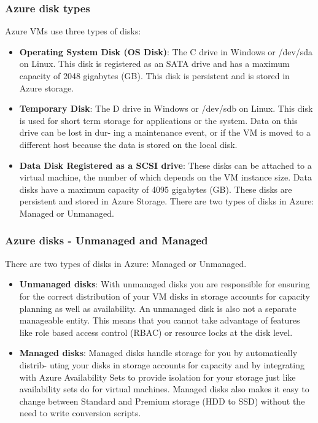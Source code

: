 \documentclass[12pt]{article}
\begin{document}
\subsubsection{Azure disk types}
Azure VMs use three types of disks:
\begin{itemize}
    
    \item \textbf{Operating System Disk (OS Disk)}: The C drive in Windows or /dev/sda on Linux. This disk is registered as an SATA drive and has a maximum capacity of 2048 gigabytes (GB). This disk is persistent and is stored in Azure storage.
    \item \textbf{Temporary Disk}: The D drive in Windows or /dev/sdb on Linux. This disk is used for short term storage for applications or the system. Data on this drive can be lost in dur- ing a maintenance event, or if the VM is moved to a different host because the data is stored on the local disk.
    \item \textbf{Data Disk Registered as a SCSI drive}: These disks can be attached to a virtual machine, the number of which depends on the VM instance size. Data disks have a maximum capacity of 4095 gigabytes (GB). These disks are persistent and stored in Azure Storage.
There are two types of disks in Azure: Managed or Unmanaged.
\end{itemize}

\subsubsection{Azure disks - Unmanaged and Managed}
There are two types of disks in Azure: Managed or Unmanaged.
\begin{itemize}
    \item \textbf{Unmanaged disks}: With unmanaged disks you are responsible for ensuring for the correct distribution of your VM disks in storage accounts for capacity planning as well as availability. An unmanaged disk is also not a separate manageable entity. This means that you cannot take advantage of features like role based access control (RBAC) or resource locks at the disk level.
    \item \textbf{Managed disks}: Managed disks handle storage for you by automatically distrib- uting your disks in storage accounts for capacity and by integrating with Azure Availability Sets to provide isolation for your storage just like availability sets do for virtual machines. Managed disks also makes it easy to change between Standard and Premium storage (HDD to SSD) without the need to write conversion scripts.
\end{itemize}
\end{document}
